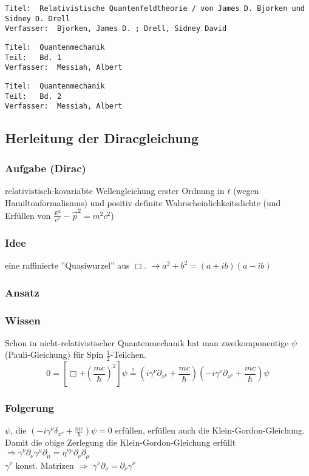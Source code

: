 \documentclass[twoside,a4paper]{scrartcl}
\renewcommand{\1}{\mathds{1}}
\newcommand{\Ra}{\Rightarrow}
\newcommand{\ra}{\rightarrow}
\begin{document}
\begin{tiny}
\begin{verbatim}
Titel: 	Relativistische Quantenfeldtheorie / von James D. Bjorken und Sidney D. Drell
Verfasser: 	Bjorken, James D. ; Drell, Sidney David
\end{verbatim}
\end{tiny}

\begin{tiny}
\begin{verbatim}
Titel: 	Quantenmechanik
Teil: 	Bd. 1
Verfasser: 	Messiah, Albert
\end{verbatim}
\end{tiny}

\begin{tiny}
\begin{verbatim}
Titel: 	Quantenmechanik
Teil: 	Bd. 2
Verfasser: 	Messiah, Albert
\end{verbatim}
\end{tiny}


\subsection{Herleitung der Diracgleichung}
\subsubsection*{Aufgabe (Dirac)}
relativistisch-kovariabte Wellengleichung erster Ordnung in $t$ (wegen Hamiltonformalismus) und positiv definite Wahrscheinlichkeitsdichte (und Erfüllen von $\frac{E^2}{c^2}-\vec p^2=m^2c^2$)
\subsubsection*{Idee}
eine raffinierte ''Quasiwurzel'' aus $\Box$. $\ra a^2+b^2=(a+ib)(a-ib)$
\subsubsection*{Ansatz}
\subsubsection*{Wissen}
Schon in nicht-relativistischer Quantenmechanik hat man zweikomponentige $\psi$ (Pauli-Gleichung) für Spin $\frac{1}{2}$-Teilchen.
$$0=[\Box+(\frac{mc}{\hbar})^2]\psi\stackrel{!}{=} (i\gamma^\nu\partial_{x^\nu}+\frac{mc}{\hbar})(-i\gamma^\nu\partial_{x^\nu}+\frac{mc}{\hbar})\psi$$
\subsubsection*{Folgerung}
$\psi$, die $(-i\gamma^\nu\delta_{x^\nu}+\frac{mc}{\hbar})\psi=0$ erfüllen, erfüllen auch die Klein-Gordon-Gleichung.\\
Damit die obige Zerlegung die Klein-Gordon-Gleichung erfüllt $\Ra \gamma^\nu\partial_\nu \gamma^\mu \partial_\mu=\eta^{\nu \mu} \partial_\nu \partial_\mu$\\
$\gamma^\nu$ konst. Matrizen $\Ra$ $\gamma^\nu \partial_\nu=\partial_\nu \gamma^\nu$ 
\end{document}
